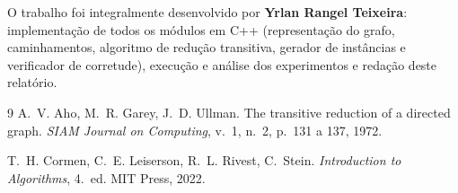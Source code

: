 \documentclass[10pt,twocolumn]{article}
\begin{document}
O trabalho foi integralmente desenvolvido por \textbf{Yrlan Rangel Teixeira}: implementação de todos os módulos em C++ (representação do grafo, caminhamentos, algoritmo de redução transitiva, gerador de instâncias e verificador de corretude), execução e análise dos experimentos e redação deste relatório.

\begin{thebibliography}{9}
A.~V. Aho, M.~R. Garey, J.~D. Ullman.
\newblock The transitive reduction of a directed graph.
\newblock \emph{SIAM Journal on Computing}, v.~1, n.~2, p.~131 a 137, 1972.

T.~H. Cormen, C.~E. Leiserson, R.~L. Rivest, C.~Stein.
\newblock \emph{Introduction to Algorithms}, 4.~ed.
\newblock MIT Press, 2022.
\end{thebibliography}
\end{document}
